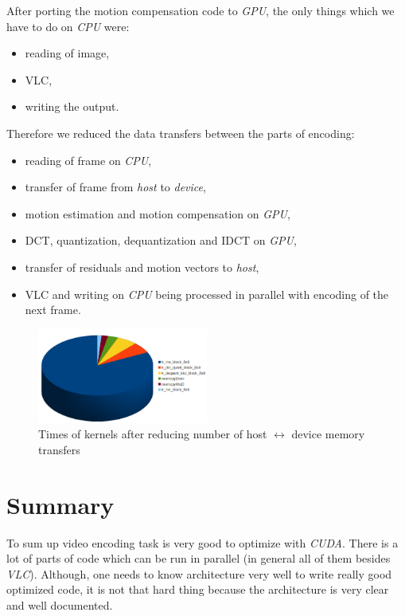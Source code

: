 \documentclass[11pt]{article}
\begin{document}
After porting the motion compensation code to \emph{GPU}, the only things
which we have to do on \emph{CPU} were:
\begin{itemize}
  \item reading of image,
  \item VLC,
  \item writing the output.
\end{itemize}
Therefore we reduced the data transfers between the parts of encoding:
\begin{itemize}
  \item reading of frame on \emph{CPU},
  \item transfer of frame from \emph{host} to \emph{device},
  \item motion estimation and motion compensation on \emph{GPU},
  \item DCT, quantization, dequantization and IDCT on \emph{GPU},
  \item transfer of residuals and motion vectors to \emph{host},
  \item VLC and writing on \emph{CPU} being processed in parallel with
  encoding of the next frame.
\end{itemize}

\begin{figure}[h]
\centering
\includegraphics[width=0.5\textwidth]{images/after_all_device.png}
\caption{Times of kernels after reducing number of host $\leftrightarrow$ device memory transfers}
\end{figure}

\section{Summary}
To sum up video encoding task is very good to optimize with \emph{CUDA}. There is a lot of parts of code which can be run in parallel (in general all of them besides \emph{VLC}). Although, one needs to know architecture very well to write really good optimized code, it is not that hard thing because the architecture is very clear and well documented.
\end{document}

